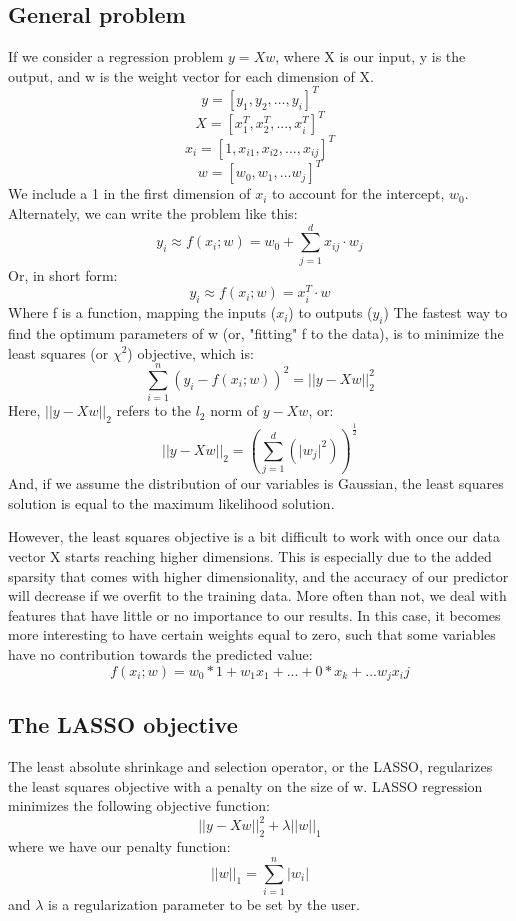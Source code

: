 \documentclass[%
 reprint,
 amsmath,amssymb,
 aps,
]{revtex4-1}
\begin{document}
\subsection{General problem}
If we consider a regression problem $y = Xw$, where X is our input, y is the output, and w is the weight vector for each dimension of X.
\[
y = [y_1, y_2, ..., y_i]^T
\]
\[
X = [x_1^T, x_2^T, ..., x_i^T]^T
\]
\[
x_i = [1,x_{i1},x_{i2},...,x_{ij}]^T
\]
\[
w = [w_0, w_1, ...  w_j]^T
\]
We include a 1 in the first dimension of $x_i$ to account for the intercept, $w_0$.
Alternately, we can write the problem like this:
\[
y_i \approx f(x_i;w) = w_0 + \sum_{j=1}^{d}x_{ij}\cdot w_j
\]
Or, in short form:
\[
y_i \approx f(x_i;w) = x_{i}^T\cdot w
\]
Where f is a function, mapping the inputs ($x_i$) to outputs ($y_i$)
The fastest way to find the optimum parameters of w (or, "fitting" f to the data), is to minimize the least squares (or $\chi^2$) objective, which is:
\[
\sum^n_{i=1}(y_i - f(x_i;w))^2 = \lvert\lvert y - Xw \rvert\rvert^2_2
\]
Here, $\lvert\lvert y - Xw \rvert\rvert_2$ refers to the $l_2$ norm of $y - Xw$, or:
\[
\lvert\lvert y - Xw \rvert\rvert_2 = (\sum_{j=1}^d (\lvert w_j \rvert^2) )^{\frac{1}{2}}
\]
And, if we assume the distribution of our variables is Gaussian, the least squares solution is equal to the maximum likelihood solution. \cite{paisley_columbiax:_2018}

However, the least squares objective is a bit difficult to work with once our data vector X starts reaching higher dimensions.
This is especially due to the added sparsity that comes with higher dimensionality, and the accuracy of our predictor will decrease if we overfit to the training data.
More often than not, we deal with features that have little or no importance to our results.
In this case, it becomes more interesting to have certain weights equal to zero, such that some variables have no contribution towards the predicted value:
\[
f(x_i;w) = w_0 * 1 + w_1 x_1 + ... + 0 * x_k + ... w_j x_ij
\]


\subsection{The LASSO objective}

The least absolute shrinkage and selection operator, or the LASSO, regularizes the least squares objective with a penalty on the size of w.
LASSO regression minimizes the following objective function:
\[
\lvert\lvert y - Xw \rvert\rvert^2_2 + \lambda \lvert\lvert w \rvert\rvert_1
\]
where we have our penalty function:
\[
\lvert\lvert w \rvert\rvert_1 = \sum^n_{i=1}\lvert w_i \rvert
\]
and $\lambda$ is a regularization parameter to be set by the user.
\cite{tibshirani_regression_1996}
\end{document}
